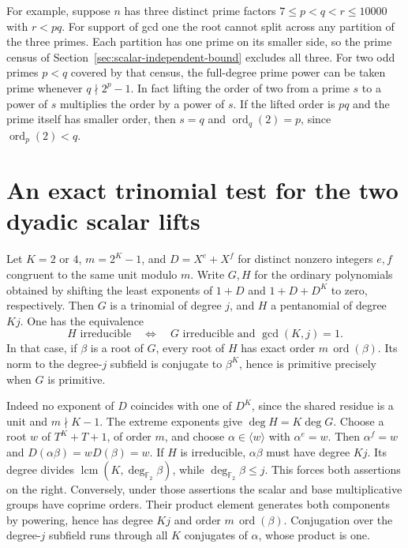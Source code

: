 \documentclass[11pt]{article}
\newcommand{\F}{\mathbb F_2}
\newcommand{\ord}{\operatorname{ord}}
\begin{document}
For example, suppose \(n\) has three distinct prime factors
\(7\le p<q<r\le10000\) with \(r<pq\). For support of gcd one the
root cannot split across any partition of the three primes. Each
partition has one prime on its smaller side, so the prime census of
Section~\ref{sec:scalar-independent-bound} excludes all three.
For two odd primes \(p<q\) covered by that census, the full-degree
prime power can be taken prime whenever \(q\nmid2^p-1\).
In fact lifting the order of two from a prime \(s\) to a power
of \(s\) multiplies the order by a power of \(s\).
If the lifted order is \(pq\) and the prime itself has smaller
order, then \(s=q\) and \(\ord_q(2)=p\), since \(\ord_p(2)<q\).

\clearpage
\section{An exact trinomial test for the two dyadic scalar lifts}
\label{sec:dyadic-trinomial-lifts}
Let \(K=2\) or \(4\), \(m=2^K-1\), and \(D=X^e+X^f\) for distinct
nonzero integers \(e,f\) congruent to the same unit modulo \(m\).
Write \(G,H\) for the ordinary polynomials obtained by shifting the
least exponents of \(1+D\) and \(1+D+D^K\) to zero, respectively.
Then \(G\) is a trinomial of degree \(j\), and \(H\) a pentanomial
of degree \(Kj\). One has the equivalence
\[
 H\text{ irreducible}\quad\Longleftrightarrow\quad
 G\text{ irreducible and }\gcd(K,j)=1.
\]
In that case, if \(\beta\) is a root of \(G\), every root of \(H\)
has exact order \(m\,\ord(\beta)\). Its norm to the degree-\(j\)
subfield is conjugate to \(\beta^K\), hence is primitive precisely
when \(G\) is primitive.

Indeed no exponent of \(D\) coincides with one of \(D^K\), since
the shared residue is a unit and \(m\nmid K-1\).
The extreme exponents give \(\deg H=K\deg G\).
Choose a root \(w\) of \(T^K+T+1\), of order \(m\), and choose
\(\alpha\in\langle w\rangle\) with \(\alpha^e=w\).
Then \(\alpha^f=w\) and \(D(\alpha\beta)=wD(\beta)=w\).
If \(H\) is irreducible, \(\alpha\beta\) must have degree \(Kj\).
Its degree divides \(\operatorname{lcm}(K,\deg_{\F}\beta)\), while
\(\deg_{\F}\beta\le j\). This forces both assertions on the right.
Conversely, under those assertions the scalar and base multiplicative
groups have coprime orders. Their product element generates both
components by powering, hence has degree \(Kj\) and order
\(m\,\ord(\beta)\). Conjugation over the degree-\(j\) subfield
runs through all \(K\) conjugates of \(\alpha\), whose product is one.
\end{document}
